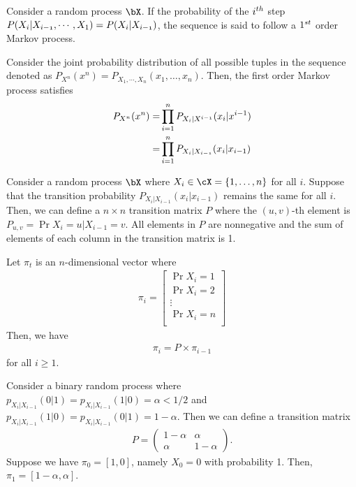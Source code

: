\documentclass{article}
\newcommand{\mn}[1]{\mathnormal{#1}}
\begin{document}
\begin{definition}
Consider a random process $\bX$. 
If the probability of the $i^\mn{th}$ step $P(X_i|X_\mn{i-1},\cdots,X_1)=P(X_i|X_\mn{i-1})$,
the sequence is said to follow a $1^\mn{st}$ order Markov process.
\end{definition}

\begin{remark}
Consider the joint probability distribution of all possible tuples in the sequence denoted as $P_{X^n}(x^n)=P_{X_1,\cdots,X_n}(x_1, \dots, x_n)$.
Then, the first order Markov process satisfies
\begin{align}
     P_{X^n}(x^n) =& \prod_{i=1}^{n} P_{X_i|X^\mn{i-1}}(x_i|x^{i-1})\\
    =& \prod_{i=1}^{n} P_{X_i|X_\mn{i-1}}(x_i|x_{i-1})
\end{align}
\end{remark}

Consider a random process $\bX$ where $X_i\in\cX = \{1, \dots, n\}$ for all $i$.
Suppose that the transition probability $P_{X_i|X_{i-1}}(x_i|x_{i-1})$ remains the same for all $i$.
Then, we can define a $n\times n$ transition matrix $P$ where the $(u, v)$-th element is $P_{u, v} = \Pr{X_i=u|X_{i-1}=v}$.
All elements in $P$ are nonnegative and the sum of elements of each column in the transition matrix is 1.

Let $\pi_t$ is an $n$-dimensional vector where
\begin{align}
    \pi_i = \begin{bmatrix}
        \Pr{X_i=1}\\
        \Pr{X_i=2}\\
        \vdots \\
        \Pr{X_i=n}\\
    \end{bmatrix}
\end{align}
Then, we have
\begin{align}
    \pi_i = P \times \pi_{i-1}
\end{align}
for all $i\geq 1$.

\begin{example}
    Consider a binary random process where $p_{X_i|X_{i-1}}(0|1)=p_{X_i|X_{i-1}}(1|0) = \alpha<1/2$ and $p_{X_i|X_{i-1}}(1|0)=p_{X_i|X_{i-1}}(0|1) = 1-\alpha$.
    Then we can define a transition matrix
    \begin{align}
        P = \begin{pmatrix}
            1-\alpha & \alpha\\
            \alpha & 1-\alpha
        \end{pmatrix}.
    \end{align}
    Suppose we have $\pi_0 = [1, 0]$, namely $X_0=0$ with probability 1.
    Then, $\pi_1 = [1-\alpha, \alpha]$.
\end{example}
\end{document}
